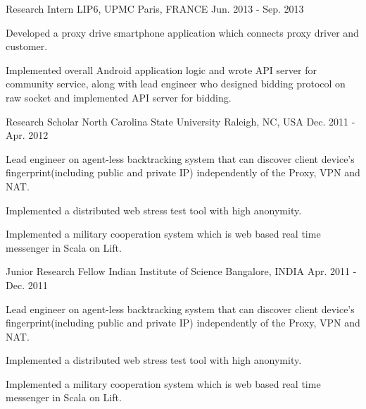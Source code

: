 \begin{cventries}
  \cventry
    {Research Intern} %
    {LIP6, UPMC} %
    {Paris, FRANCE} %
    {Jun. 2013 - Sep. 2013} %
    {
      \begin{cvitems} %
        \item {Developed a proxy drive smartphone application which connects proxy driver and customer.}
        \item {Implemented overall Android application logic and wrote API server for community service, along with lead engineer who designed bidding protocol on raw socket and implemented API server for bidding.}
      \end{cvitems}
    }

  \cventry
    {Research Scholar} %
    {North Carolina State University} %
    {Raleigh, NC, USA} %
    {Dec. 2011 - Apr. 2012} %
    {
      \begin{cvitems} %
        \item {Lead engineer on agent-less backtracking system that can discover client device's fingerprint(including public and private IP) independently of the Proxy, VPN and NAT.}
        \item {Implemented a distributed web stress test tool with high anonymity.}
        \item {Implemented a military cooperation system which is web based real time messenger in Scala on Lift.}
      \end{cvitems}
    }
    
  \cventry
    {Junior Research Fellow} %
    {Indian Institute of Science} %
    {Bangalore, INDIA} %
    {Apr. 2011 - Dec. 2011} %
    {
      \begin{cvitems} %
        \item {Lead engineer on agent-less backtracking system that can discover client device's fingerprint(including public and private IP) independently of the Proxy, VPN and NAT.}
        \item {Implemented a distributed web stress test tool with high anonymity.}
        \item {Implemented a military cooperation system which is web based real time messenger in Scala on Lift.}
      \end{cvitems}
    }
    

\end{cventries}
